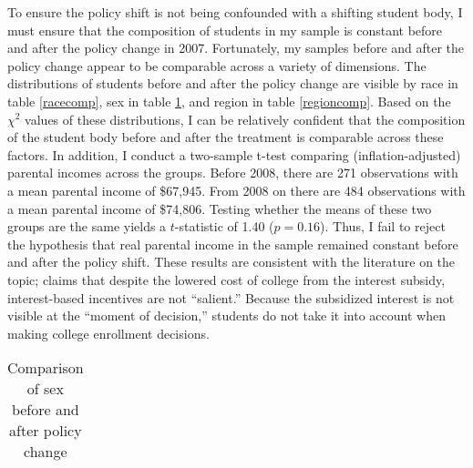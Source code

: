 \documentclass[12pt]{article}
\begin{document}
	To ensure the policy shift is not being confounded with a shifting student body, I must ensure that the composition of students in my sample is constant before and after the policy change in 2007. Fortunately, my samples before and after the policy change appear to be comparable across a variety of dimensions. The distributions of students before and after the policy change are visible by race in table \ref{racecomp}, sex in table \ref{sexcomp}, and region in table \ref{regioncomp}. Based on the $\chi^2$ values of these distributions, I can be relatively confident that the composition of the student body before and after the treatment is comparable across these factors. In addition, I conduct a two-sample t-test comparing (inflation-adjusted) parental incomes across the groups. Before 2008, there are 271 observations with a mean parental income of \$67,945. From 2008 on there are 484 observations with a mean parental income of \$74,806. Testing whether the means of these two groups are the same yields a $t$-statistic of 1.40 ($p = 0.16$). Thus, I fail to reject the hypothesis that real parental income in the sample remained constant before and after the policy shift. These results are consistent with the literature on the topic; \textcite{dynarski2015} claims that despite the lowered cost of college from the interest subsidy, interest-based incentives are not ``salient.'' Because the subsidized interest is not visible at the ``moment of decision,'' students do not take it into account when making college enrollment decisions. 
	
{
	\begin{table}
		\centering
		\caption{Comparison of race before and after policy change}
		\label{racecomp}
	\end{table}

	\begin{table}
		\small
		\centering
		\caption{Comparison of sex before and after policy change}
		\begin{tabular}{lrrrrrr}
			
		\end{tabular}
		\label{sexcomp}
	\end{table}

	\begin{table}
		\centering
		\caption{Comparison of region before and after policy change}
		\label{regioncomp}
	\end{table}
}
	
\end{document}
